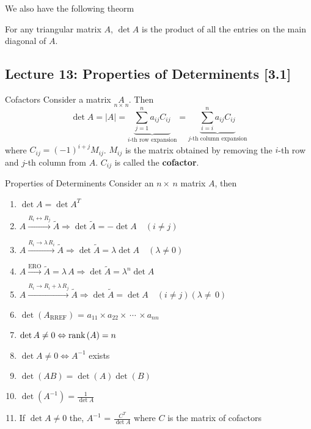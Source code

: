 We also have the following theorm 

\begin{thm}{}{}
    For any triangular matrix $A$, $\det{A}$ is the product of all the entries on the main diagonal of $A$. 
\end{thm}

\subsection{Lecture 13: Properties of Determinents [3.1]}

\begin{defbox}{Cofactors}{}
    Consider a matrix $\underset{n\times\,n}{A}$. Then 
    \[
        \det{A} = |A| = \underbrace{\sum_{j=1}^{n}a_{ij}C_{ij}}_{\text{$i$-th row expansion}} = \underbrace{\sum_{i=i}^{n}a_{ij}C_{ij}}_{\text{$j$-th column expansion}}
    \]
    where $C_{ij} = \left(-1\right)^{i+j}M_{ij}$. $M_{ij}$ is the matrix obtained by removing the $i$-th row and $j$-th column from $A$. $C_{ij}$ is called the \textbf{cofactor}.
\end{defbox}

\begin{impbox}{Properties of Determinents}{}
    Consider an $n\times\,n$ matrix $A$, then
    \begin{enumerate}
        \item $\det{A} = \det{A}^{T}$
        \item $A \xrightarrow{R_i \leftrightarrow R_j} \tilde{A} \Rightarrow \det{\tilde{A}} = -\det{A} \quad (i \neq j)$
        \item $A \xrightarrow{R_i \to \lambda\,R_i} \tilde{A} \Rightarrow \det{\tilde{A}} = \lambda\det{A} \quad (\lambda \neq 0)$
        \item ${A} \xrightarrow{\text{ERO}} \tilde{A} = \lambda\,A \Rightarrow \det{\tilde{A}} = \lambda^{n}\det{A}$
        \item $A \xrightarrow{R_i \to R_i + \lambda\,R_j} \tilde{A} \Rightarrow \det{\tilde{A}} = \det{A} \quad (i \neq j)(\lambda\neq\,0)$
        \item $\det\left(A_{\text{RREF}}\right)$ = $a_{11} \times a_{22} \times\,\cdots\,\times a_{nn}$
        \item $\det{A} \neq 0 \Leftrightarrow \text{rank}\left(A\right) = n$\label{prop:7}
        \item $\det{A} \neq 0 \Leftrightarrow A^{-1}$ exists
        \item $\det\left(AB\right) = \det\left(A\right)\det\left(B\right)$
        \item $\det\left(A^{-1}\right) = \frac{1}{\det{A}}$
        \item If $\det{A} \neq 0$ the, $A^{-1}$ = $\frac{C^{T}}{\det{A}}$ where $C$ is the matrix of cofactors
    \end{enumerate}
\end{impbox}

